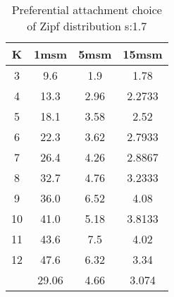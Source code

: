 \begin{table}[H]
\centering
\begin{tabular}{c|ccc}
K &1msm &5msm &15msm\\
\hline
3 & 9.6 & 1.9 & 1.78\\
4 & 13.3 & 2.96 & 2.2733\\
5 & 18.1 & 3.58 & 2.52\\
6 & 22.3 & 3.62 & 2.7933\\
7 & 26.4 & 4.26 & 2.8867\\
8 & 32.7 & 4.76 & 3.2333\\
9 & 36.0 & 6.52 & 4.08\\
10 & 41.0 & 5.18 & 3.8133\\
11 & 43.6 & 7.5 & 4.02\\
12 & 47.6 & 6.32 & 3.34\\
\hline
& 29.06 & 4.66 & 3.074\\
\end{tabular}
\caption{Preferential attachment choice of Zipf distribution s:1.7}
\label{tab:s1.7}
\end{table}
